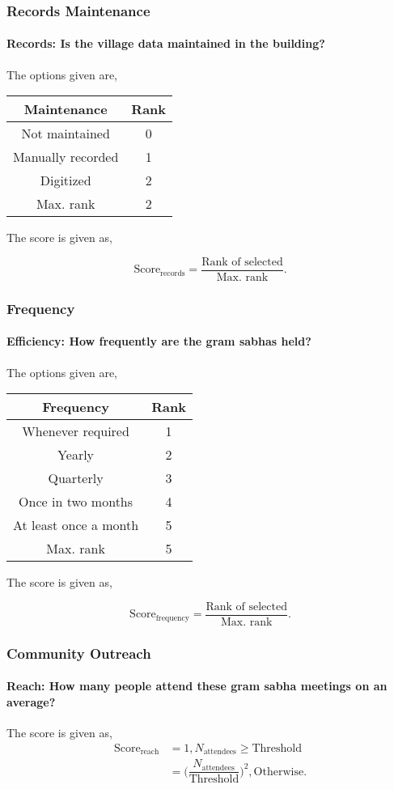 \documentclass[oneside,twocolumn]{article}
\newcommand{\tsub}[2]{\text{#1}_{\text{#2}}}
\newcommand{\tsubb}[2]{#1_{\text{#2}}}
\newcommand{\dsub}[2]{\dfrac{\text{#1}}{\text{#2}}}
\newcommand{\singsel}[1]
{
	\[
		\tsub{Score}{#1} = \dsub{Rank of selected}{Max. rank}.
	\]
}
\newenvironment{ttable}
{
\begin{center}
\begin{tabular}{c|c}
\hline
}
{
\\ \hline
\end{tabular}
\end{center}
}
\begin{document}
\subsubsection{Records Maintenance}
\paragraph{Records: Is the village data maintained in the building?}
The options given are,
\begin{ttable}
	Maintenance & Rank \\ \hline
	Not maintained & 0 \\
	Manually recorded & 1 \\
	Digitized & 2 \\ \hline
	Max. rank & 2
\end{ttable}
The score is given as,
\singsel{records}
\subsubsection{Frequency}
\paragraph{Efficiency: How frequently are the gram sabhas held?}
The options given are,
\begin{ttable}
	Frequency & Rank \\ \hline
	Whenever required & 1 \\
	Yearly & 2 \\
	Quarterly & 3 \\
	Once in two months & 4 \\
	At least once a month & 5 \\ \hline
	Max. rank & 5
\end{ttable}
The score is given as,
\singsel{frequency}
\subsubsection{Community Outreach}
\paragraph{Reach: How many people attend these gram sabha meetings on an average?}
The score is given as,
\begin{align*}
	\tsub{Score}{reach} &= 1, \tsubb{N}{attendees} \ge \text{Threshold} \\
	&= \Big( \dfrac{\tsubb{N}{attendees}}{\text{Threshold}} \Big)^{2}, \text{Otherwise}.
\end{align*}
\end{document}
